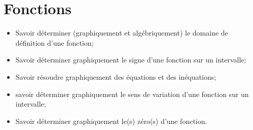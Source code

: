 \chapter{Fonctions}\label{ChFonctions}

\begin{acquis}
\begin{itemize}
\item Savoir déterminer (graphiquement et algébriquement) le domaine de définition d'une fonction;
\item Savoir déterminer graphiquement le signe d'une fonction sur un intervalle;
\item Savoir résoudre graphiquement des équations et des inéquations;
\item savoir déterminer graphiquement le sens de variation d'une fonction sur un intervalle;
\item Savoir déterminer graphiquement le(s) zéro(s) d'une fonction.
\end{itemize}
\end{acquis}


\exercicesbase
\begin{colonne*exercice}

\end{colonne*exercice}

\connaissances
%

\pagebreak


